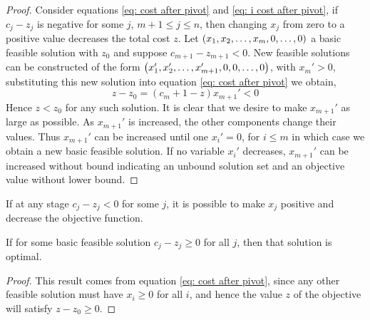 %

\begin{proof}
Consider equations \eqref{eq: cost after pivot} and \eqref{eq: i cost after pivot}, if $c_j-z_j$ is negative for some $j$, $m+1\leq j\leq n$, then changing $x_j$ from zero to a positive value decreases the total cost $z$.  Let $\left( x_1, x_2, \dots, x_m, 0,\dots, 0 \right)$ a basic feasible solution with $z_0$ and suppose $c_{m+1}-z_{m+1}<0$. New feasible solutions can be constructed of the form $\left( x_1', x_2',\dots, x_{m+1}',0,0,\dots,0 \right)$, with $x_m'>0$, substituting this new solution into equation \eqref{eq: cost after pivot} we obtain,
\begin{equation*}
	z-z_0=(c_m+1-z)x_{m+1}'<0
\end{equation*}
Hence $z<z_0$ for any such solution. It is clear that we desire to make $x_{m+1}'$ as large as possible.  As $x_{m+1}'$ is increased, the other components change their values. Thus $x_{m+1}'$ can be increased until one $x_i'=0$, for $i\leq m$ in which case we obtain a new basic feasible solution. If no variable $x_i'$ decreases, $x_{m+1}'$ can be increased without bound indicating an unbound solution set and an objective value without lower bound.
\end{proof} 
If at any stage $c_j-z_j<0$ for some $j$, it is possible to make $x_j$ positive and decrease the objective function. 
\begin{theorem}
If for some basic feasible solution $c_j-z_j\geq 0$
for all $j$, then that solution is optimal.
\end{theorem}
\begin{proof}
	This result comes from equation \eqref{eq: cost after pivot}, since any other feasible solution must have $x_i\geq 0$ for all $i$, and hence the value $z$ of the objective will satisfy $z-z_0\geq 0$.
\end{proof}

